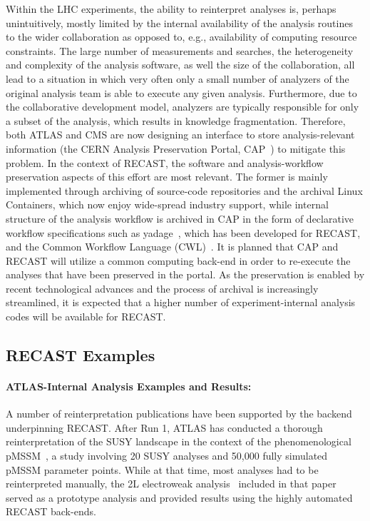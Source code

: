 Within the LHC experiments, the ability to reinterpret analyses is, perhaps unintuitively, mostly limited by the internal availability of the analysis routines to the wider collaboration as opposed to, e.g., availability of computing resource constraints. The large number of measurements and searches, the heterogeneity and complexity of the analysis software, as well the size of the collaboration, all lead to a situation in which very often only a small number of analyzers of the original analysis team is able to execute any given analysis. Furthermore, due to the collaborative development model, analyzers are typically responsible for only a subset of the analysis, which results in knowledge fragmentation. Therefore, both ATLAS and CMS are now designing an interface to store analysis-relevant information (the CERN Analysis Preservation Portal, CAP~\cite{CAP}) to mitigate this problem. In the context of RECAST, the software and analysis-workflow preservation aspects of this effort are most relevant. The former is mainly implemented through archiving of source-code repositories and the archival Linux Containers, which now enjoy wide-spread industry support, while internal structure of the analysis workflow is archived in CAP in the form of declarative workflow specifications such as yadage~\cite{Cranmer:2017frf}, which has been developed for RECAST, and the Common Workflow Language (CWL)~\cite{CWL}. It is planned that CAP and RECAST will utilize a common computing back-end in order to re-execute the analyses that have been preserved in the portal. As the preservation is enabled by recent technological advances and the process of archival is increasingly streamlined, it is expected that a higher number of experiment-internal analysis codes will be available for RECAST.

\subsection{RECAST Examples}

\paragraph{ATLAS-Internal Analysis Examples and Results:}

A number of reinterpretation publications have been supported by the backend underpinning RECAST. After Run 1, ATLAS has conducted a thorough reinterpretation of the SUSY landscape in the context of the phenomenological pMSSM~\cite{Aad:2015baa}, a study involving 20 SUSY analyses and 50,000 fully simulated pMSSM parameter points. While at that time, most analyses had to be reinterpreted manually, the 2L electroweak analysis~\cite{Aad:2014vma} included in that paper served as a prototype analysis and provided results using the highly automated RECAST back-ends.

